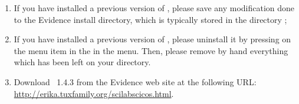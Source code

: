 \begin{enumerate}
\item If you have installed a previous version of \ee, please save any
  modification done to the Evidence install directory, which is
  typically stored in the directory
  ;
\item If you have installed a previous version of \ee, please
  uninstall it by pressing on the  menu item in the
  in the  menu. Then, please remove by hand everything
  which has been left on your  directory.
\item Download \ee\ 1.4.3 from the Evidence web site at the following URL:
  \url{http://erika.tuxfamily.org/scilabscicos.html}.



\end{enumerate}
